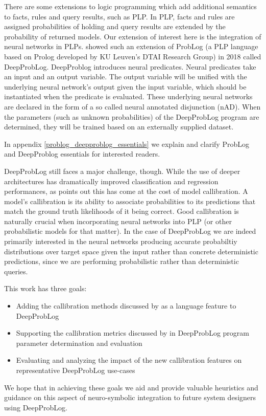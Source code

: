 There are some extensions to logic programming which add additional semantics to facts, rules and query results, such as PLP. In PLP, facts and rules are assigned probabilities of holding and query results are extended by the probability of returned models. Our extension of interest here is the integration of neural networks in PLPs. \cite{manhaeve2018deepproblog} showed such an extension of ProbLog (a PLP language based on Prolog developed by KU Leuven's DTAI Research Group) in 2018 called DeepProbLog. DeepProblog introduces neural predicates. Neural predicates take an input and an output variable. The output variable will be unified with the underlying neural network's output given the input variable, which should be instantiated when the predicate is evaluated. These underlying neural networks are declared in the form of a so called neural annotated disjunction (nAD). When the parameters (such as unknown probabilities) of the DeepProbLog program are determined, they will be trained based on an externally supplied dataset. \par
In appendix \ref{problog_deepproblog_essentials} we explain and clarify ProbLog and DeepProblog essentials for interested readers. \par
DeepProbLog still faces a major challenge, though. While the use of deeper architectures has dramatically improved classification and regression performances, as \cite{guo2017calibration} points out this has come at the cost of model callibration. A model's callibration is its ability to associate probabilities to its predictions that match the ground truth likelihoods of it being correct. Good callibration is naturally crucial when incorporating neural networks into PLP (or other probabilistic models for that matter). In the case of DeepProbLog we are indeed primarily interested in the neural networks producing accurate probabiltiy distributions over target space given the input rather than concrete deterministic predictions, since we are performing probabilistic rather than deterministic queries. \par
This work has three goals:
\begin{itemize}
  \item Adding the callibration methods discussed by \cite{guo2017calibration} as a language feature to DeepProbLog
  \item Supporting the callibration metrics discussed by \cite{guo2017calibration} in DeepProbLog program parameter determination and evaluation
  \item Evaluating and analyzing the impact of the new callibration features on representative DeepProbLog use-cases
\end{itemize}
We hope that in achieving these goals we aid and provide valuable heuristics and guidance on this aspect of neuro-symbolic integration to future system designers using DeepProbLog.